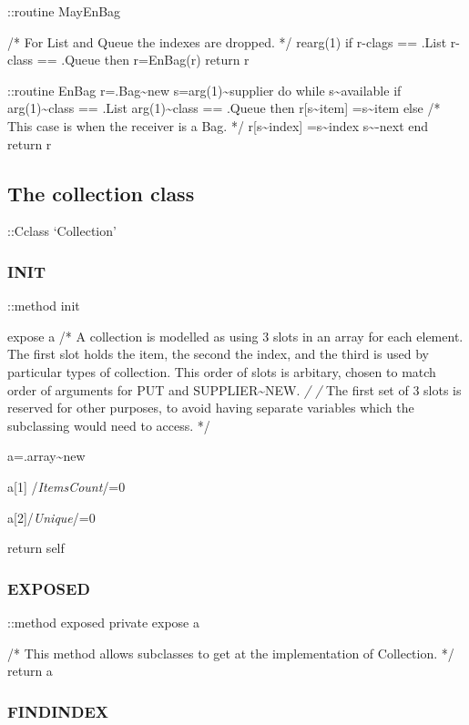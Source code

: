 ::routine MayEnBag

/* For List and Queue the indexes are dropped. */ rearg(1) if r-clags ==
.List \textbar{} r-class == .Queue then r=EnBag(r) return r

::routine EnBag r=.Bag\textasciitilde new
s=arg(1)\textasciitilde supplier do while s\textasciitilde available if
arg(1)\textasciitilde class == .List \textbar{}
arg(1)\textasciitilde class == .Queue then r{[}s\textasciitilde item{]}
=s\textasciitilde item else /* This case is when the receiver is a Bag.
*/ r{[}s\textasciitilde index{]} =s\textasciitilde index
s\textasciitilde-next end return r

\subsection{The collection class}\label{the-collection-class}

::Cclass `Collection'

\subsubsection{INIT}\label{init}

::method init

expose a /* A collection is modelled as using 3 slots in an array for
each element. The first slot holds the item, the second the index, and
the third is used by particular types of collection. This order of slots
is arbitary, chosen to match order of arguments for PUT and
SUPPLIER\textasciitilde NEW. \emph{/ /} The first set of 3 slots is
reserved for other purposes, to avoid having separate variables which
the subclassing would need to access. */

a=.array\textasciitilde new

a{[}1{]} /\emph{ItemsCount}/=0

a{[}2{]}/\emph{Unique}/=0

return self

\subsubsection{EXPOSED}\label{exposed}

::method exposed private expose a

/* This method allows subclasses to get at the implementation of
Collection. */ return a

\subsubsection{FINDINDEX}\label{findindex}

